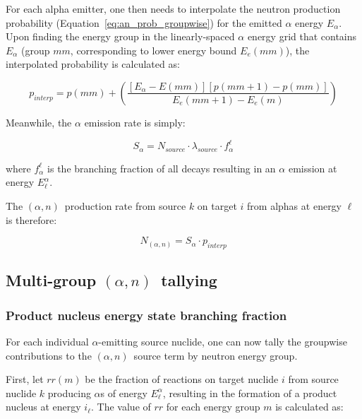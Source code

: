 \documentclass[10pt]{article}
\newcommand{\alphn}[0]{$\left(\alpha,n\right)$}
\begin{document}
For each alpha emitter, one then needs to interpolate the neutron production probability (Equation~\eqref{eq:an_prob_groupwise}) for the emitted $\alpha$ energy $E_\alpha$. Upon finding the energy group in the linearly-spaced $\alpha$ energy grid that contains $E_\alpha$ (group $mm$, corresponding to lower energy bound $E_e\left(mm\right)$), the interpolated probability is calculated as:

\begin{equation}
\boxed{ \displaystyle p_{interp} = p\left(mm\right) + \left( \frac{ \left[ E_\alpha - E\left(mm\right) \right] \left[ p\left(mm + 1\right) - p\left(mm \right) \right]}{E_e\left(mm+1 \right) - E_e\left(m\right) } \right) }
\label{eq:p_interp}
\end{equation}

Meanwhile, the $\alpha$ emission rate is simply: 

\begin{equation}
S_\alpha = N_{source} \cdot \lambda_{source} \cdot f_\alpha^\ell
\end{equation}

where $f_\alpha^\ell$ is the branching fraction of all decays resulting in an $\alpha$ emission at energy $E^\alpha_\ell$.

The \alphn\ production rate from source $k$ on target $i$ from alphas at energy $\ell$ is therefore:

\begin{equation}
N_{\left(\alpha,n\right)} = S_\alpha \cdot p_{interp}
\end{equation}

\subsection{Multi-group \alphn\ tallying}

\subsubsection{Product nucleus energy state branching fraction}

For each individual $\alpha$-emitting source nuclide, one can now tally the groupwise contributions to the \alphn\ source term by neutron energy group.

First, let $rr\left(m\right)$ be the fraction of reactions on target nuclide $i$ from source nuclide $k$ producing $\alpha$s of energy $E^\alpha_\ell$, resulting in the formation of a product nucleus at energy $i_\ell$. The value of $rr$ for each energy group $m$ is calculated as:
\end{document}
